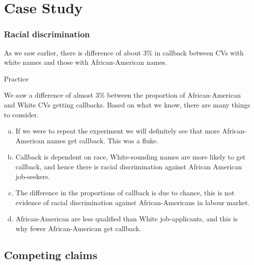 \documentclass[notes,11pt, aspectratio=169]{beamer}
\newcommand{\pq}[1]{
\begin{beamerboxesrounded}[shadow = false, lower = prac ques body]{}
#1
\end{beamerboxesrounded}
}
\begin{document}
\section{Case Study}
\begin{frame}
\frametitle{Racial discrimination}
\begin{center}
\colorbox{textboxred!85}{\parbox{0.75\textwidth}{As we saw earlier, there is difference of about 3\% in callback between CVs with white names and those with African-American names.}}
\end{center}
\end{frame}
\begin{frame}{Practice}

\pq{We saw a difference of almost 3\% between the proportion of African-American and White CVs getting callbacks. Based on what we know, there are many things to consider.}

\begin{enumerate}[(a)]

\item If we were to repeat the experiment we will definitely see that more African-American names get callback. This was a fluke.

\item Callback is dependent on race, White-sounding names are more likely to get callback, and hence there is racial discrimination against African American job-seekers.

\item The difference in the proportions of callback is due to chance, this is not  evidence of racial discrimination against African-Americans in labour market. 

\item African-American are less qualified than White job-applicants, and this is why fewer African-American get callback.
\end{enumerate}
\end{frame}


\subsection{Competing claims}

\end{document}
